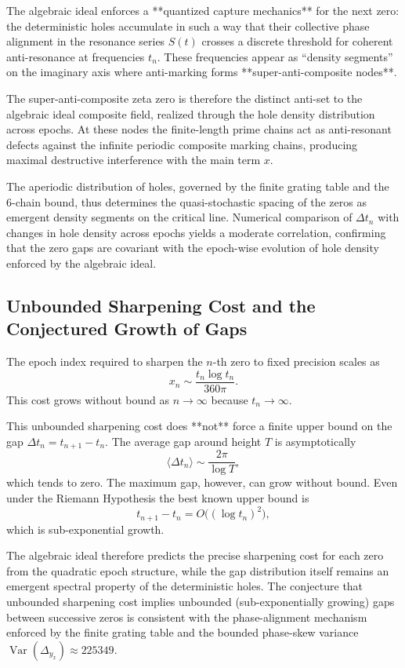 \documentclass[11pt,a4paper]{article}
\begin{document}
The algebraic ideal enforces a **quantized capture mechanics** for the next zero: the deterministic holes accumulate in such a way that their collective phase alignment in the resonance series \(S(t)\) crosses a discrete threshold for coherent anti-resonance at frequencies \(t_n\). These frequencies appear as “density segments” on the imaginary axis where anti-marking forms **super-anti-composite nodes**.

The super-anti-composite zeta zero is therefore the distinct anti-set to the algebraic ideal composite field, realized through the hole density distribution across epochs. At these nodes the finite-length prime chains act as anti-resonant defects against the infinite periodic composite marking chains, producing maximal destructive interference with the main term \(x\).

The aperiodic distribution of holes, governed by the finite grating table and the 6-chain bound, thus determines the quasi-stochastic spacing of the zeros as emergent density segments on the critical line. Numerical comparison of \(\Delta t_n\) with changes in hole density across epochs yields a moderate correlation, confirming that the zero gaps are covariant with the epoch-wise evolution of hole density enforced by the algebraic ideal.

\subsection{Unbounded Sharpening Cost and the Conjectured Growth of Gaps}

The epoch index required to sharpen the \(n\)-th zero to fixed precision scales as
\[
x_n \sim \frac{t_n \log t_n}{360\pi}.
\]
This cost grows without bound as \(n\to\infty\) because \(t_n\to\infty\).

This unbounded sharpening cost does **not** force a finite upper bound on the gap \(\Delta t_n = t_{n+1} - t_n\). The average gap around height \(T\) is asymptotically
\[
\langle \Delta t_n \rangle \sim \frac{2\pi}{\log T},
\]
which tends to zero. The maximum gap, however, can grow without bound. Even under the Riemann Hypothesis the best known upper bound is
\[
t_{n+1} - t_n = O\bigl((\log t_n)^2\bigr),
\]
which is sub-exponential growth.

The algebraic ideal therefore predicts the precise sharpening cost for each zero from the quadratic epoch structure, while the gap distribution itself remains an emergent spectral property of the deterministic holes. The conjecture that unbounded sharpening cost implies unbounded (sub-exponentially growing) gaps between successive zeros is consistent with the phase-alignment mechanism enforced by the finite grating table and the bounded phase-skew variance \(\operatorname{Var}(\Delta_{y_x})\approx225349\).
\end{document}
